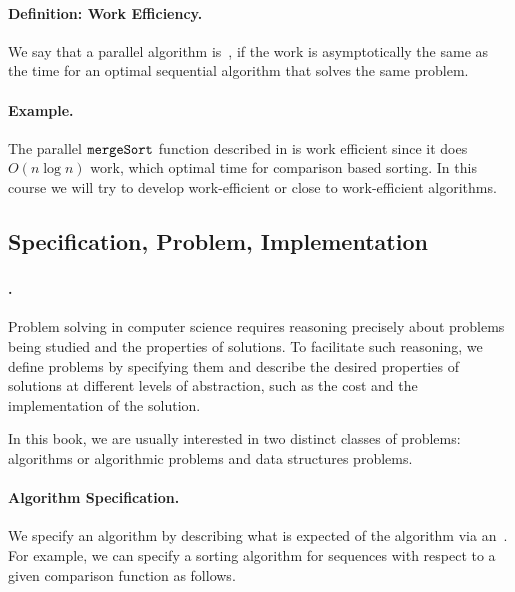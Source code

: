 \paragraph{Definition: Work Efficiency.}
We say that a parallel algorithm is~, if the work is asymptotically the same as the time for
an optimal sequential algorithm that solves the same problem.

\paragraph{Example.}
The parallel $\texttt{mergeSort}$ function described in
 is work efficient since it does $O(n \log n)$
work, which optimal time for comparison based sorting.  In this course
we will try to develop work-efficient or close to work-efficient
algorithms.



\subsection{Specification, Problem, Implementation}

\subsubsection{}

\paragraph{.}
Problem solving in computer science requires reasoning precisely about
problems being studied and the properties of solutions.
%
To facilitate such reasoning,  we define problems by
specifying them and describe the desired properties of solutions at
different levels of abstraction, such as the cost and the
implementation  of the solution.

In this book, we are usually interested in two distinct classes of
problems: algorithms or algorithmic problems and data structures
problems.

\paragraph{Algorithm Specification.}
We specify an algorithm by describing what is expected of the
algorithm via an~.
%
For example, we can specify a sorting algorithm for sequences with
respect to a given comparison function as follows.

